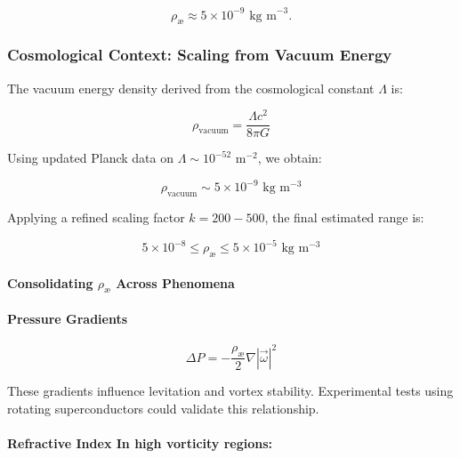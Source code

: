 \begin{equation*}
    \rho_\text{\ae} \approx 5 \times 10^{-9} \text{ kg m}^{-3}.
\end{equation*}

\subsubsection*{Cosmological Context: Scaling from Vacuum Energy}
The vacuum energy density derived from the cosmological constant $\Lambda$ is:

\begin{equation*}
\rho_{\text{vacuum}} = \frac{\Lambda c^2}{8 \pi G}
\end{equation*}

Using updated Planck data on $\Lambda \sim 10^{-52} \text{ m}^{-2}$, we obtain:

\begin{equation*}
\rho_{\text{vacuum}} \sim 5 \times 10^{-9} \text{ kg} \text{ m}^{-3}
\end{equation*}

Applying a refined scaling factor $k = 200 - 500$, the final estimated range is:

\begin{equation*}
5 \times 10^{-8} \leq \rho_\text{\ae} \leq 5 \times 10^{-5} \text{ kg} \text{ m}^{-3}
\end{equation*}

\paragraph{Consolidating $\rho_\text{\ae}$ Across Phenomena}

\paragraph{Pressure Gradients}

\begin{equation*}
\Delta P = -\frac{\rho_\text{\ae}}{2} \nabla |\vec{\omega}|^2
\end{equation*}

These gradients influence levitation and vortex stability. Experimental tests using rotating superconductors could validate this relationship.

\paragraph{Refractive Index In high vorticity regions:}

